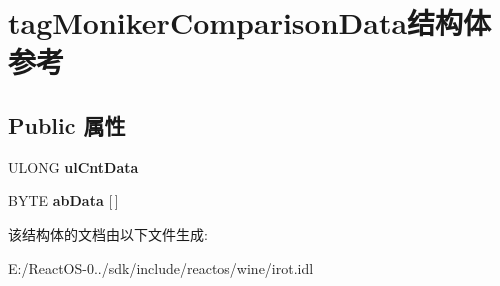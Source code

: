 \hypertarget{structtag_moniker_comparison_data}{}\section{tag\+Moniker\+Comparison\+Data结构体 参考}
\label{structtag_moniker_comparison_data}
\subsection*{Public 属性}
\begin{DoxyCompactItemize}
\item 
\mbox{\label{structtag_moniker_comparison_data_ae0fcf7e21d07be3e5a4f40736a7e3ba5}} 
U\+L\+O\+NG {\bfseries ul\+Cnt\+Data}
\item 
\mbox{\label{structtag_moniker_comparison_data_ad5b8d6a92c2f21170fa36e4187bec51e}} 
B\+Y\+TE {\bfseries ab\+Data} \mbox{[}$\,$\mbox{]}
\end{DoxyCompactItemize}


该结构体的文档由以下文件生成\+:\begin{DoxyCompactItemize}
\item 
E\+:/\+React\+O\+S-\/0../sdk/include/reactos/wine/irot.\+idl\end{DoxyCompactItemize}
